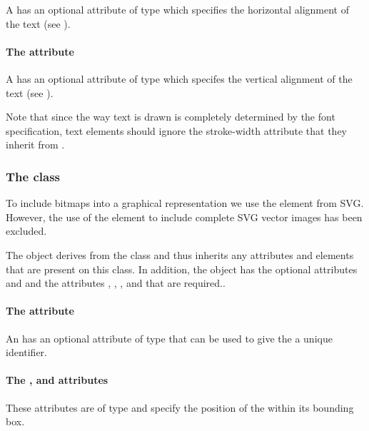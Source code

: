 A \Text has an optional attribute  of type
\HTextAnchor which specifies the horizontal alignment of the text (see ).

\paragraph{The \fixttspace{} attribute}

A \Text has an optional attribute  of type
\VTextAnchor which specifes the vertical alignment of the text (see ).

Note that since the way text is drawn is completely determined by the font 
specification, text elements should ignore the stroke-width attribute that they 
inherit from \GraphicalPrimitiveOneD.

\subsubsection{The  class}
\label{image-class}

To include bitmaps into a graphical representation we use the \Image element 
from SVG. However, the use of the \Image element to include complete SVG 
vector images has been excluded.


The \Image object derives from the \TransformationTwoD class and thus
inherits any attributes and elements that are present on this class.
In addition, the \Image object has the optional attributes  and  and the attributes , , ,  and  that are required..

\paragraph{The \fixttspace{} attribute}

An \Image has an optional attribute  of type  that can be used to give the \Image a unique identifier.

\paragraph{The \fixttspace{}, \fixttspace{} and \fixttspace{}  attributes}

These attributes are of type
\RelAbsVector and specify the position of the \Image within its bounding box.

